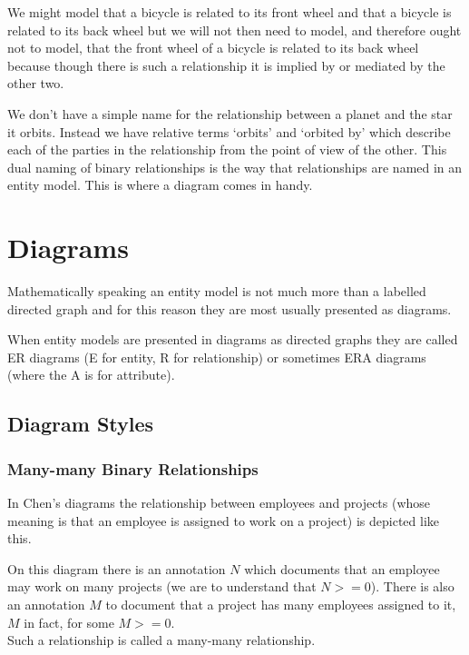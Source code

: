 \mynote We might model that a bicycle is related to its front wheel and that a bicycle is related to its back wheel but we will not then need to model,  and therefore ought not to model, that the front wheel of a bicycle is related to its back wheel because though there is such a relationship it is implied by or mediated by the other two.  

\mynote 
We don't have a simple name for the relationship between a planet and the star it orbits. Instead we have  relative terms `orbits' and `orbited by' which describe each of the parties in the relationship from the point of view of the other. This dual naming of binary relationships is the way that relationships are named in an entity model. 
This is where a diagram comes in handy.

\section{Diagrams}
  
\mynote Mathematically speaking an entity model is not much more than a labelled directed graph and for this reason they are most usually presented as diagrams.

\mynote When entity models are presented in diagrams as directed graphs
they are called ER diagrams (E for entity, R for relationship) or sometimes
ERA diagrams (where the A is for attribute). 

\subsection{Diagram Styles}

\subsubsection*{Many-many Binary Relationships}
In Chen's diagrams the relationship between employees and projects (whose meaning is that
an employee is assigned to work on a project) is depicted like this.
\begin{center}

\end{center}
On this diagram there is an annotation $N$ which documents that an employee may work on many projects (we are to understand that $N >= 0$). There is also an annotation $M$ to document that
a project has many employees assigned to it, $M$ in fact, for some $M >= 0$. \\

\noindent Such a relationship is called a many-many relationship.  \\


